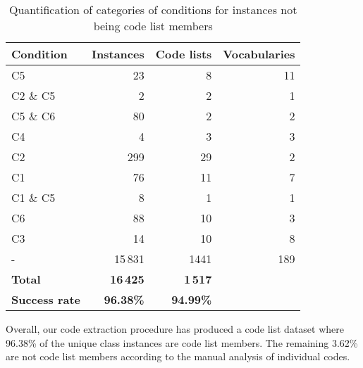 \begin{table}[ht]
\footnotesize
\centering
\begin{tabular}{|l|r|r|r|}
\hline
\textbf{Condition}     & \textbf{Instances}   & \textbf{Code lists} & \textbf{Vocabularies} \\ \hline
C5                     & 23                   &  8                  &  11                    \\ \hline
C2 \& C5               & 2                    &  2                  &  1                    \\ \hline
C5 \& C6               & 80                   &  2                  &  2                    \\ \hline
C4                     & 4                    &  3                  &  3                    \\ \hline
C2                     & 299                  &  29                 &  2                    \\ \hline
C1                     & 76                   &  11                 &  7                    \\ \hline
C1 \& C5               & 8                    &  1                  &  1                    \\ \hline
C6                     & 88                   &  10                 &  3                    \\ \hline
C3                     & 14                   &  10                 &  8                    \\ \hline
-                      & 15\,831              &  1441               &  189                  \\ \hline \hline
\textbf{Total}         & \textbf{16\,425}     &  \textbf{1\,517}    &                       \\ \hline
\textbf{Success rate}  & \textbf{96.38\%}     &  \textbf{94.99\%}   &                       \\ \hline
\end{tabular}
\caption{Quantification of categories of conditions for instances not being code list members} \label{tab:non-code-list-conditions}
\end{table}

Overall, our code extraction procedure has produced a code list dataset where 96.38\% of the unique class instances are code list members. The remaining 3.62\% are not code list members according to the manual analysis of individual codes.

